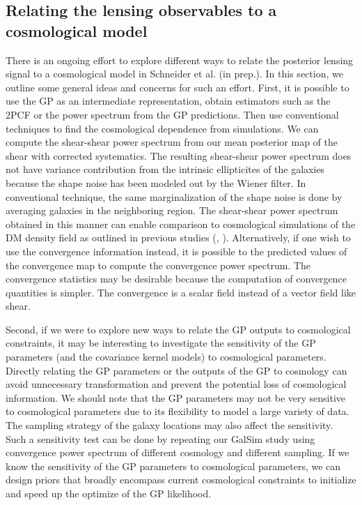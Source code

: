 \subsection{Relating the lensing observables to a cosmological model}
There is an ongoing effort to explore different ways to relate the posterior lensing signal 
to a cosmological model in Schneider et al. (in prep.). 
In this section, we outline some general ideas and concerns for such an effort. 
First, it is possible to use the GP as an intermediate representation, 
obtain estimators such as the 2PCF or the power spectrum from the GP predictions. 
Then use conventional techniques 
 to find the cosmological dependence from simulations.  
We can compute the shear-shear power spectrum from our mean posterior map of the shear with
corrected systematics. 
The resulting shear-shear power spectrum does not have variance contribution from the 
intrinsic ellipticites of the galaxies because the shape noise has been modeled
out by the Wiener filter. In conventional technique, the same marginalization
of the shape noise is done by averaging galaxies in the neighboring region.
The shear-shear power spectrum obtained in this manner can enable comparison to
cosmological simulations of the DM density field as outlined in previous studies (\citealt{Jee2013a},
\citealt{Semboloni2007}). Alternatively, if one wish to use the convergence
information instead, it is possible to the predicted values of the convergence
map to compute the convergence power spectrum. The convergence statistics may
be desirable because the computation of convergence quantities is simpler. The
convergence is a scalar field instead of a vector field like shear. 

Second, if we were to explore new ways to relate the GP outputs to cosmological constraints,  
it may be interesting to investigate the sensitivity of the GP parameters (and
the covariance kernel models) to cosmological parameters. 
Directly relating the GP parameters or the outputs of the GP to cosmology can
avoid unnecessary transformation and prevent the potential loss of cosmological 
information. 
We should note that the GP parameters may not be very sensitive to cosmological parameters
due to its flexibility to model a large variety of data. The sampling strategy of
the galaxy locations may also affect the sensitivity. Such a sensitivity test can be
done by repeating our {\sc GalSim} study using convergence power spectrum of different cosmology 
and different sampling. 
If we know the sensitivity of the GP parameters to cosmological parameters, 
we can design priors that broadly encompass current cosmological constraints 
to initialize and speed up the optimize of the GP likelihood. 

